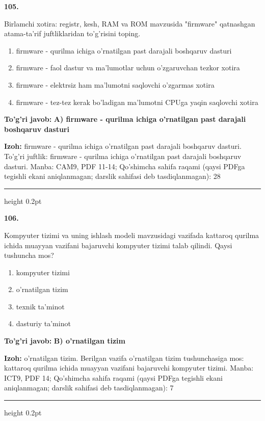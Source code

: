 \documentclass[10pt,a4paper]{article}
\begin{document}
{\bfseries\sffamily\color{ink} 105.}
\par
Birlamchi xotira: registr, kesh, RAM va ROM mavzusida "firmware" qatnashgan atama-ta'rif juftliklaridan to'g'risini toping.
\begin{enumerate}[label=\Alph*),leftmargin=9mm]
\item firmware - qurilma ichiga o'rnatilgan past darajali boshqaruv dasturi
\item firmware - faol dastur va ma'lumotlar uchun o'zgaruvchan tezkor xotira
\item firmware - elektrsiz ham ma'lumotni saqlovchi o'zgarmas xotira
\item firmware - tez-tez kerak bo'ladigan ma'lumotni CPUga yaqin saqlovchi xotira
\end{enumerate}
\begin{tcolorbox}[enhanced,breakable,colback=teal!4,colframe=teal!60!black,boxrule=0.45pt,arc=1.2mm,left=2.7mm,right=2.7mm,top=1.8mm,bottom=1.8mm,before skip=2mm,after skip=2mm]
{\bfseries\sffamily\color{teal}To'g'ri javob:} \textbf{A) firmware - qurilma ichiga o'rnatilgan past darajali boshqaruv dasturi}
\par\smallskip
{\bfseries Izoh:} firmware - qurilma ichiga o'rnatilgan past darajali boshqaruv dasturi. To'g'ri juftlik: firmware - qurilma ichiga o'rnatilgan past darajali boshqaruv dasturi. Manba: CAM9, PDF 11-14; Qo'shimcha sahifa raqami (qaysi PDFga tegishli ekani aniqlanmagan; darslik sahifasi deb tasdiqlanmagan): 28
\end{tcolorbox}
\vspace{2mm}\hrule height 0.2pt\vspace{3mm}

{\bfseries\sffamily\color{ink} 106.}
\par
Kompyuter tizimi va uning ishlash modeli mavzusidagi vazifada kattaroq qurilma ichida muayyan vazifani bajaruvchi kompyuter tizimi talab qilindi. Qaysi tushuncha mos?
\begin{enumerate}[label=\Alph*),leftmargin=9mm]
\item kompyuter tizimi
\item o'rnatilgan tizim
\item texnik ta'minot
\item dasturiy ta'minot
\end{enumerate}
\begin{tcolorbox}[enhanced,breakable,colback=teal!4,colframe=teal!60!black,boxrule=0.45pt,arc=1.2mm,left=2.7mm,right=2.7mm,top=1.8mm,bottom=1.8mm,before skip=2mm,after skip=2mm]
{\bfseries\sffamily\color{teal}To'g'ri javob:} \textbf{B) o'rnatilgan tizim}
\par\smallskip
{\bfseries Izoh:} o'rnatilgan tizim. Berilgan vazifa o'rnatilgan tizim tushunchasiga mos: kattaroq qurilma ichida muayyan vazifani bajaruvchi kompyuter tizimi. Manba: ICT9, PDF 14; Qo'shimcha sahifa raqami (qaysi PDFga tegishli ekani aniqlanmagan; darslik sahifasi deb tasdiqlanmagan): 7
\end{tcolorbox}
\vspace{2mm}\hrule height 0.2pt\vspace{3mm}
\end{document}

